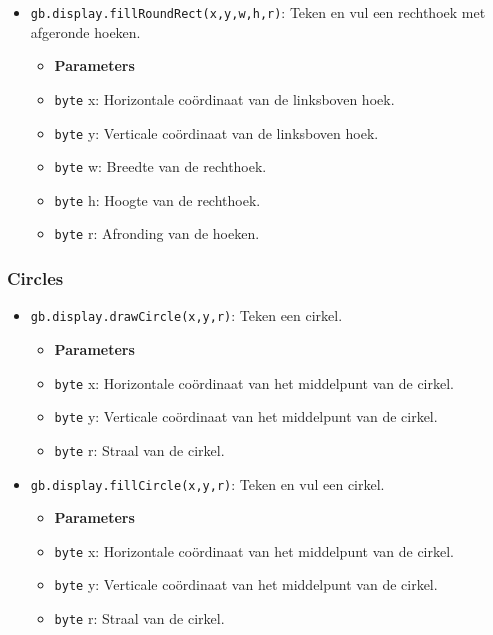 \documentclass[a4paper,titlepage,12pt]{article}
\begin{document}
\begin{itemize}
		\item \texttt{gb.display.fillRoundRect(x,y,w,h,r)}: Teken en vul een rechthoek met afgeronde hoeken.
		\begin{itemize}
			\item [] \textbf{Parameters}
			\item \texttt{byte} x: Horizontale coördinaat van de linksboven hoek.
			\item \texttt{byte} y: Verticale coördinaat van de linksboven hoek.
			\item \texttt{byte} w: Breedte van de rechthoek.
			\item \texttt{byte} h: Hoogte van de rechthoek.
			\item \texttt{byte} r: Afronding van de hoeken.
		\end{itemize}
	\end{itemize}

	\subsubsection{Circles}
	\begin{itemize}
		\item \texttt{gb.display.drawCircle(x,y,r)}: Teken een cirkel.
		\begin{itemize}
			\item [] \textbf{Parameters}
			\item \texttt{byte} x: Horizontale coördinaat van het middelpunt van de cirkel.
			\item \texttt{byte} y: Verticale coördinaat van het middelpunt van de cirkel.
			\item \texttt{byte} r: Straal van de cirkel.
		\end{itemize}
	
		\item \texttt{gb.display.fillCircle(x,y,r)}: Teken en vul een cirkel.
		\begin{itemize}
			\item [] \textbf{Parameters}
			\item \texttt{byte} x: Horizontale coördinaat van het middelpunt van de cirkel.
			\item \texttt{byte} y: Verticale coördinaat van het middelpunt van de cirkel.
			\item \texttt{byte} r: Straal van de cirkel.
		\end{itemize}
	\end{itemize}
\end{document}
